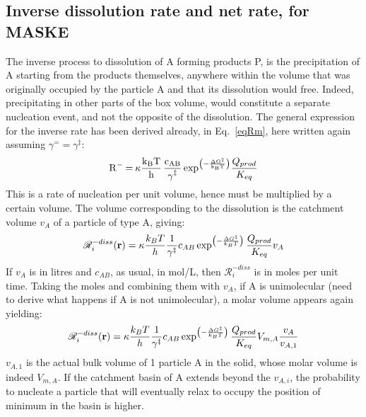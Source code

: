 \documentclass[12pt]{paper}    %
\newcommand{\RR}{\mathscr{R}}
\newcommand{\eqname}{Eq.~}
\begin{document}
\subsection{Inverse dissolution rate and net rate, for MASKE}

The inverse process to dissolution of A forming products P, is the precipitation of A starting from the products themselves, anywhere within the volume that was originally occupied by the particle A and that its dissolution would free. Indeed, precipitating in other parts of the box volume, would constitute a separate nucleation event, and not the opposite of the dissolution. The general expression for the inverse rate has been derived already, in \eqname\ref{eqRm}, here written again assuming $\gamma^= = \gamma^\ddag$:
%
\begin{equation}
\ce{R- =  \kappa \frac{k_BT}{h} \frac{c_{AB}}{\gamma^\ddag} exp^{\left( -\frac{\Delta G^\ddag}{k_BT}\right)}} \frac{Q_{prod}}{K_{eq}}  
\end{equation}
%
This is a rate of nucleation per unit volume, hence must be multiplied by a certain volume. The volume corresponding to the dissolution is the catchment volume $v_{A}$ of a particle of type A, giving:
%
\begin{equation}
\RR^{-diss}_i ({\bf r}) = \kappa \frac{k_BT}{h} \frac{1}{\gamma^\ddag} c_{AB}\exp^{\left( - \frac{\Delta G^\ddag}{k_BT}\right)} \frac{Q_{prod}}{K_{eq}} v_{A}
\end{equation}
%
If $v_A$ is in litres and $c_{AB}$, as usual, in mol/L, then $\RR^{-diss}_i$ is in moles per unit time. Taking the moles and combining them with $v_A$, if A is unimolecular (need to derive what happens if A is not unimolecular), a molar volume appears again yielding:
%
\begin{equation}
\RR^{-diss}_i ({\bf r}) = \kappa \frac{k_BT}{h} \frac{1}{\gamma^\ddag} c_{AB}\exp^{\left( - \frac{\Delta G^\ddag}{k_BT}\right)} \frac{Q_{prod}}{K_{eq}} V_{m,A} \frac{v_A}{v_{A,1}}
\end{equation}
%
$v_{A,1}$ is the actual bulk volume of 1 particle A in the solid, whose molar volume is indeed $V_{m,A}$. If the catchment basin of A extends beyond the $v_{A,i}$, the probability to nucleate a particle that will eventually relax to occupy the position of minimum in the basin is higher. 
\end{document}
